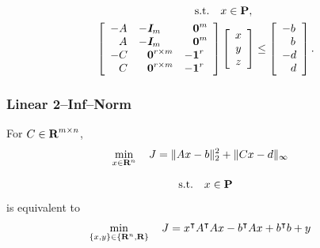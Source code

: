 \documentclass{article}
\begin{document}
    \begin{align*}
        \st\quad &x\in\poly,
        \\
        \left[\begin{array}{lll}
                -A
            &
                -\eye_m
            &
                \minus \zeros^{m}
            \\
                \minus A
            &
                -\eye_m
            &
                \minus \zeros^{m}
            \\
                -C
            &
                \minus \zeros^{r\times m}
            &
                -\ones^{r}
            \\
                \minus C 
            & 
                \minus \zeros^{r\times m}
            &
                -\ones^{r}
        \end{array}\right]
        &
        \left[\begin{array}{c}
            x   \\
            y   \\
            z
        \end{array}\right]
        \leq
        \left[\begin{array}{l}
            -b                \\
            \minus b      \\
            -d           \\
            \minus d
        \end{array}\right].
    \end{align*}

\subsubsection{Linear 2--Inf--Norm}

    For $C\in\textbf{R}^{m\times n}$,
    \begin{align*}
        \min_{x\in\textbf{R}^n}\quad J & =     \|A x-b\|_2^2
                        +   \|C x - d \|_\infty
    \end{align*}

    \begin{align*}
        \text{s.t.}\quad x\in\textbf{P}
    \end{align*}
    is equivalent to
    \begin{align*}
    \min_{\{x,y\}\in\{\textbf{R}^n,\textbf{R}\}}
    \quad J & =     x^\intercal A^\intercal A x 
                    -   b^\intercal A x
                    +   b^\intercal b
                    + y
    \end{align*}
\end{document}

